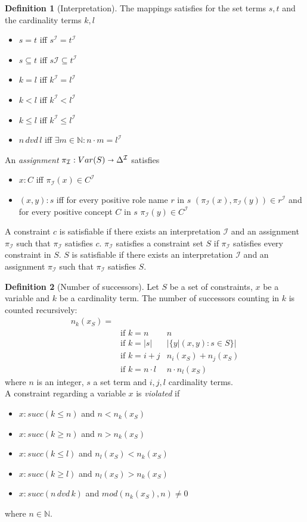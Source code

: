 \documentclass[a4paper,11pt]{scrartcl}
\theoremstyle{break}
\theoremstyle{definition}
\newtheorem{mydef}{Definition}
\begin{document}
\begin{mydef}[Interpretation]
The mappings satisfies for the set terms $s,t$ and the cardinality terms $k,l$
\begin{itemize}
\item $s=t$ iff $s^\mathcal{I}=t^\mathcal{I}$
\item $s\subseteq t$ iff $s\mathcal{I}\subseteq t^\mathcal{I}$
\item $k=l$ iff $k^\mathcal{I}=l^\mathcal{I}$
\item $k<l$ iff $k^\mathcal{I}<l^\mathcal{I}$
\item $k\leq l$ iff $k^\mathcal{I}\leq l^\mathcal{I}$
\item $n\,dvd\,l$ iff $\exists m\in\mathbb{N}:n\cdot m = l^\mathcal{I}$
\end{itemize}
An \textit{assignment} $\pi_\mathcal{I}: Var(S)\shortrightarrow \Delta^\mathcal{I}$ satisfies 
\begin{itemize}
\item $x:C$ iff $\pi_\mathcal{I}(x)\in C^\mathcal{I}$ 
\item $(x,y):s$ iff for every positive role name $r$ in $s$ $(\pi_\mathcal{I}(x),\pi_\mathcal{I}(y))\in r^\mathcal{I}$ and for every positive concept $C$ in $s$ $\pi_\mathcal{I}(y)\in C^\mathcal{I}$
\end{itemize} 
A constraint $c$ is satisfiable if there exists an interpretation $\mathcal{I}$ and an assignment $\pi_\mathcal{I}$ such that $\pi_\mathcal{I}$ satisfies $c$. $\pi_\mathcal{I}$ satisfies a constraint set $S$ if $\pi_\mathcal{I}$ satisfies every constraint in $S$. $S$ is satisfiable if there exists an interpretation $\mathcal{I}$ and an assignment $\pi_\mathcal{I}$ such that $\pi_\mathcal{I}$ satisfies $S$.
\end{mydef}

\begin{mydef}[Number of successors]
Let $S$ be a set of constraints, $x$ be a variable and $k$ be a cardinality term. The number of successors counting in $k$ is counted recursively:
\begin{align*}
n_k(x_S)=&\quad\quad\quad\quad&\\
&\text{if } k=n&n\\
&\text{if } k=|s|&|\{y|(x,y):s\in S\}|\\
&\text{if } k=i+j&n_i(x_S)+n_j(x_S)\\
&\text{if } k=n\cdot l&n\cdot n_l(x_S)
\end{align*}
where $n$ is an integer, $s$ a set term and $i,j,l$ cardinality terms. \\
A constraint regarding a variable $x$ is \textit{violated} if
\begin{itemize}
\item $x:succ(k\leq n)$ and $n<n_k(x_S)$
\item $x:succ(k\geq n)$ and $n>n_k(x_S)$
\item $x:succ(k\leq l)$ and $n_l(x_S)<n_k(x_S)$
\item $x:succ(k\geq l)$ and $n_l(x_S)>n_k(x_S)$
\item $x:succ(n\,dvd\,k)$ and $mod(n_k(x_S),n)\neq 0$
\end{itemize} 
where $n\in\mathbb{N}$.
\end{mydef}
\end{document}
